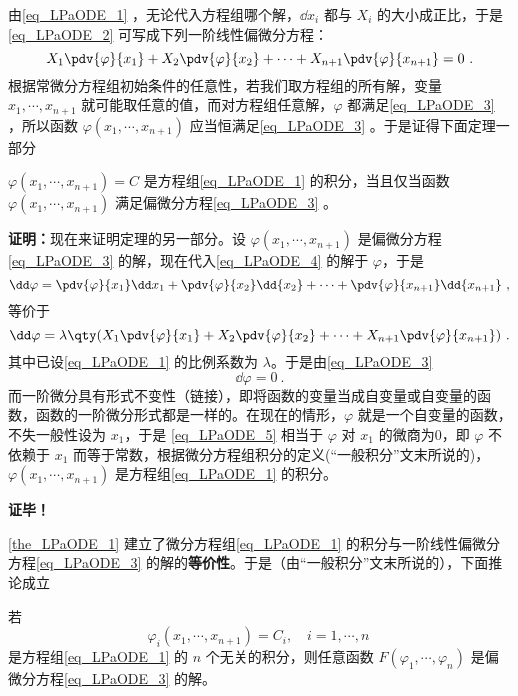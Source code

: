 由\autoref{eq_LPaODE_1} ，无论代入方程组哪个解，$\dd x_i$ 都与 $X_i$ 的大小成正比，于是\autoref{eq_LPaODE_2} 可写成下列一阶线性偏微分方程：
\begin{equation}\label{eq_LPaODE_3}
X_1\pdv{\varphi}{x_1}+X_2\pdv{\varphi}{x_2}+\cdots+X_{n+1}\pdv{\varphi}{x_{n+1}}=0~.
\end{equation}
根据常微分方程组初始条件的任意性，若我们取方程组的所有解，变量 $x_1,\cdots,x_{n+1}$ 就可能取任意的值，而对方程组任意解，$\varphi$ 都满足\autoref{eq_LPaODE_3} ，所以函数 $\varphi(x_1,\cdots,x_{n+1})$ 应当恒满足\autoref{eq_LPaODE_3} 。于是证得下面定理一部分
\begin{theorem}{}\label{the_LPaODE_1}
 $\varphi(x_1,\cdots,x_{n+1})=C$ 是方程组\autoref{eq_LPaODE_1} 的积分，当且仅当函数 $\varphi(x_1,\cdots,x_{n+1})$ 满足偏微分方程\autoref{eq_LPaODE_3} 。
\end{theorem}
 \textbf{证明：}现在来证明定理的另一部分。设 $\varphi(x_1,\cdots,x_{n+1})$ 是偏微分方程\autoref{eq_LPaODE_3} 的解，现在代入\autoref{eq_LPaODE_4} 的解于 $\varphi$，于是
 \begin{equation}
 \dd\varphi=\pdv{\varphi}{x_1}\dd x_1+\pdv{\varphi}{x_2}\dd{x_2}+\cdots+\pdv{\varphi}{x_{n+1}}\dd{x_{n+1}}~,
 \end{equation}
 等价于
 \begin{equation}
 \dd\varphi=\lambda\qty(X_1\pdv{\varphi}{x_1}+X_2\pdv{\varphi}{x_2}+\cdots+X_{n+1}\pdv{\varphi}{x_{n+1}})~.
 \end{equation}
 其中已设\autoref{eq_LPaODE_1} 的比例系数为 $\lambda$。于是由\autoref{eq_LPaODE_3} 
 \begin{equation}\label{eq_LPaODE_5}
 \dd\varphi=0~.
 \end{equation}
 而一阶微分具有形式不变性（链接），即将函数的变量当成自变量或自变量的函数，函数的一阶微分形式都是一样的。在现在的情形，$\varphi$ 就是一个自变量的函数，不失一般性设为 $x_1$，于是 \autoref{eq_LPaODE_5} 相当于 $\varphi$ 对 $x_1$ 的微商为0，即 $\varphi$ 不依赖于 $x_1$ 而等于常数，根据微分方程组积分的定义(“一般积分”文末所说的)，$\varphi(x_1,\cdots,x_{n+1})$ 是方程组\autoref{eq_LPaODE_1} 的积分。

 \textbf{证毕！}

 \autoref{the_LPaODE_1} 建立了微分方程组\autoref{eq_LPaODE_1} 的积分与一阶线性偏微分方程\autoref{eq_LPaODE_3} 的解的\textbf{等价性}。于是（由“一般积分”文末所说的），下面推论成立
 \begin{corollary}{}\label{cor_LPaODE_1}
 若
 \begin{equation}
 \varphi_i(x_1,\cdots,x_{n+1})=C_i,\quad i=1,\cdots,n~
 \end{equation}
 是方程组\autoref{eq_LPaODE_1} 的 $n$ 个无关的积分，则任意函数 $F(\varphi_1,\cdots,\varphi_n)$ 是偏微分方程\autoref{eq_LPaODE_3} 的解。
 \end{corollary}
